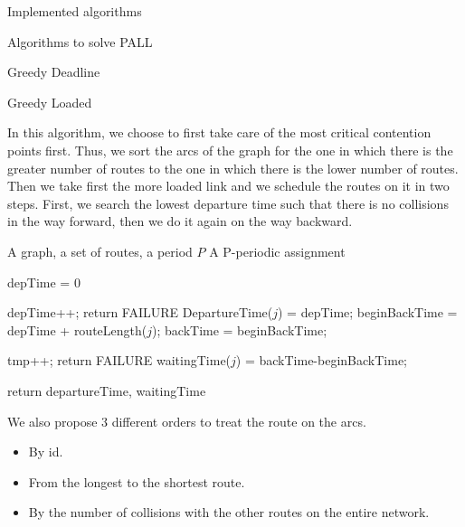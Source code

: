 \documentclass[10pt]{article}
\begin{document}
\begin{section}{Implemented algorithms}
\begin{subsection}{Algorithms to solve PALL}
\begin{subsubsection}{Greedy Deadline}
        \end{subsubsection}
    \begin{subsubsection}{Greedy Loaded}

In this algorithm, we choose to first take care of the most critical contention points first. Thus, we sort the arcs of the graph for the one in which there is the greater number of routes to the one in which there is the lower number of routes. Then we take first the more loaded link and we schedule the routes on it in two steps.
First, we search the lowest departure time such that there is no collisions in the way forward, then we do it again on the way backward. 

   	\begin{algorithm}[H]
 	\caption{Greedy Loaded}
 	\begin{algorithmic}
 	\REQUIRE A graph, a set of routes, a period $P$
	\ENSURE A P-periodic assignment

	
	\STATE depTime = $0$
	
 	
 	\STATE depTime++;
	\STATE return FAILURE
	\ENDIF
 	\ENDWHILE
	\STATE DepartureTime($j$) = depTime;
	\STATE beginBackTime = depTime + routeLength($j$);
	\STATE backTime = beginBackTime;
	
 	
 	\STATE tmp++;
	\STATE return FAILURE
	\ENDIF
 	\ENDWHILE
	\STATE waitingTime($j$) = backTime-beginBackTime;
	\ENDIF
 	\ENDFOR

 	\ENDFOR
	\STATE return departureTime, waitingTime

 	\end{algorithmic}
 	\end{algorithm}
We also propose $3$ different orders to treat the route on the arcs. 
\begin{itemize}
\item By id.
\item From the longest to the shortest route.
\item By the number of collisions with the other routes on the entire network.
\end{itemize}
    \end{subsubsection}
  \end{subsection}

\end{section}


\end{document}
